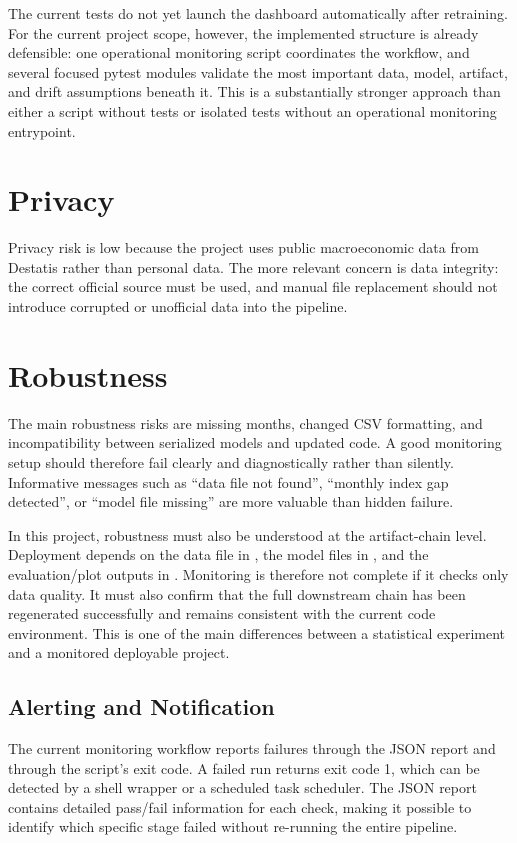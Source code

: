 The current tests do not yet launch the dashboard automatically after retraining. For the current project scope, however, the implemented structure is already defensible: one operational monitoring script coordinates the workflow, and several focused pytest modules validate the most important data, model, artifact, and drift assumptions beneath it. This is a substantially stronger approach than either a script without tests or isolated tests without an operational monitoring entrypoint.

\section{Privacy}

Privacy risk is low because the project uses public macroeconomic data from Destatis rather than personal data. The more relevant concern is data integrity: the correct official source must be used, and manual file replacement should not introduce corrupted or unofficial data into the pipeline.

\section{Robustness}

The main robustness risks are missing months, changed CSV formatting, and incompatibility between serialized models and updated code. A good monitoring setup should therefore fail clearly and diagnostically rather than silently. Informative messages such as ``data file not found'', ``monthly index gap detected'', or ``model file missing'' are more valuable than hidden failure.

In this project, robustness must also be understood at the artifact-chain level. Deployment depends on the data file in , the model files in , and the evaluation/plot outputs in . Monitoring is therefore not complete if it checks only data quality. It must also confirm that the full downstream chain has been regenerated successfully and remains consistent with the current code environment. This is one of the main differences between a statistical experiment and a monitored deployable project.

\subsection{Alerting and Notification}

The current monitoring workflow reports failures through the JSON report and through the script's exit code. A failed run returns exit code 1, which can be detected by a shell wrapper or a scheduled task scheduler. The JSON report contains detailed pass/fail information for each check, making it possible to identify which specific stage failed without re-running the entire pipeline.

